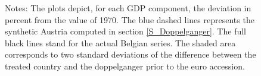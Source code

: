\documentclass[12pt]{article}
\newcommand{\annote}[1]{\parbox{\textwidth}{\renewcommand{\baselinestretch}{1.0}\vspace{12pt} \small Notes: #1}}
\begin{document}
\begin{appendices}
\begin{figure}[h!]
    \annote{The plots depict, for each GDP component, the deviation in percent from the value of 1970. The blue dashed lines represents the synthetic Austria computed in section \ref{S_Doppelganger}. The full black lines stand for the actual Belgian series. The shaded area corresponds to two standard deviations of the difference between the treated country and the doppelganger prior to the euro accession. }
\end{figure}


\end{appendices}
\end{document}
